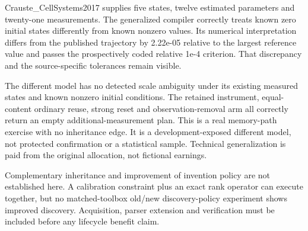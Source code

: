 \documentclass[11pt,letterpaper]{article}
\begin{document}
Crauste\_CellSystems2017 supplies five states, twelve estimated parameters and twenty-one measurements. The generalized compiler correctly treats known zero initial states differently from known nonzero values. Its numerical interpretation differs from the published trajectory by 2.22e-05 relative to the largest reference value and passes the prospectively coded relative 1e-4 criterion. That discrepancy and the source-specific tolerances remain visible.\par
The different model has no detected scale ambiguity under its existing measured states and known nonzero initial conditions. The retained instrument, equal-content ordinary reuse, strong reset and observation-removal arm all correctly return an empty additional-measurement plan. This is a real memory-path exercise with no inheritance edge. It is a development-exposed different model, not protected confirmation or a statistical sample. Technical generalization is paid from the original allocation, not fictional earnings.\par
Complementary inheritance and improvement of invention policy are not established here. A calibration constraint plus an exact rank operator can execute together, but no matched-toolbox old/new discovery-policy experiment shows improved discovery. Acquisition, parser extension and verification must be included before any lifecycle benefit claim.\par
\end{document}

